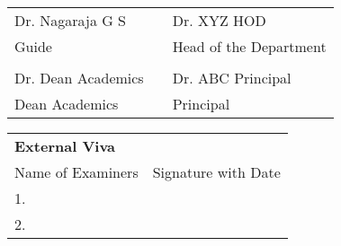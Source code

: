 \begin{titlepage}
    \vspace{1cm}
    \begin{table}[H]
    \centering
    \begin{tabular}{p{} p{} p{}}
    \centering Dr. Nagaraja G S & & \centering Dr. XYZ HOD \\
    \centering Guide & & \centering Head of the Department \\
    \\
    \centering Dr. Dean Academics & & \centering Dr. ABC Principal \\
    \centering Dean Academics & & \centering Principal \\
    \end{tabular}
    \end{table}
    
    \vspace{1cm}
    \begin{table}[H]
    \centering
    \begin{tabular}{ll}
    \textbf{\Large External Viva} & \\
    Name of Examiners & Signature with Date \\
    1. & \\
    2. & \\
    \end{tabular}
    \end{table}
    \end{titlepage}
    